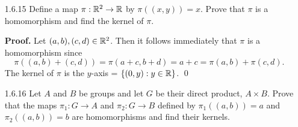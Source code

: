 \begin{enumerate}
      \textbf{Proof.} Let ker($\varphi$) be the kernel of $\varphi$. The set
      ker($\varphi$) is not empty because
      $$1_H\varphi(1_G) = \varphi(1_G) = \varphi(1_G1_G) = 
        \varphi(1_G)\varphi(1_G),$$
      so that $\varphi(1_G) = 1_H$, by cancellation; hence,
      $1_G \in \text{ker}(\varphi)$. Now let $x, y \in \text{ker}(\varphi)$.
      Then, by definition, $\varphi(x) = \varphi(y) = 1_H$, and
      $$\varphi(xy) = \varphi(x)\varphi(y) = 1_H1_H = 1_H,$$
      so that $xy \in \text{ker}(\varphi)$. That is, ker($\varphi$) is closed
      under the operation of $G$. By Exercise 1.6.1(b), it follows that
      $$\varphi(x^{-1}) = (\varphi(x))^{-1} = {1_H}^{-1} = 1_H,$$
      so that $x^{-1} \in \text{ker}(\varphi)$. Conclude by Exercise 1.1.26 that
      ker($\varphi$) is a subgroup of $G$. \qed

      Now we will show that $\varphi$ is injective if and only if the kernel of
      $\varphi$ is the identity subgroup of $G$.

      \textbf{Proof.} ($\Rightarrow$) Assume that $\varphi$ is injective. Let
      $x \in \text{ker}(\varphi)$. Thus we have that
      $\varphi(1_G) = \varphi(x) = 1_H$, so that $x = 1_G$ since $\varphi$ is
      one to one. That is, ker($\varphi$) = $\{1_G\}$, the identity subgroup of
      $G$.

      ($\Leftarrow$) Assume that ker($\varphi$) = $\{1_G\}$. Suppose that
      $\varphi(x) = \varphi(y)$ for some $x, y \in G$. Then it follows
      that $\varphi(x)\varphi(y)^{-1} = 1_H$, and  by Exercise 1.6.1, that
      $\varphi(x)\varphi(y)^{-1} = \varphi(x)\varphi(y^{-1}) =
      \varphi(xy^{-1}) = 1_H$, so that $xy^{-1} \in \text{ker}(\varphi)$. Since 
      ker($\varphi$) = $\{1_G\}$, we can conclude that $xy^{-1} = 1_G$, so that
      $x = y$; i.e., $\varphi$ is injective. \qed      
   \item[1.6.15]  Define a map $\pi : \mathbb{R}^2 \rightarrow \mathbb{R}$ by $\pi((x, y)) = x$.
                  Prove that $\pi$ is a homomorphism and find the kernel of
                  $\pi$.

      \textbf{Proof.} Let $(a, b), (c, d) \in \mathbb{R}^2$. Then it follows immediately
      that $\pi$ is a homomorphism since
      $$\pi((a, b) + (c, d)) = \pi(a + c, b + d) =
         a + c = \pi(a, b) + \pi(c, d).$$
      The kernel of $\pi$ is the $y$-axis = $\{(0, y) : y \in \mathbb{R}\}$. \qed
   \item[1.6.16]  Let $A$ and $B$ be groups and let $G$ be their direct product,
                  $A \times B$. Prove that the maps $\pi_1 : G \rightarrow A$
                  and $\pi_2 : G \rightarrow B$ defined by $\pi_1((a, b)) = a$
                  and $\pi_2((a, b)) = b$ are homomorphisms and find their
                  kernels.


\end{enumerate}
